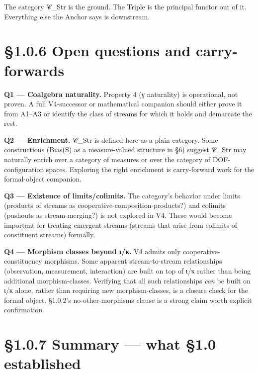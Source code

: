 \documentclass[11pt, openany]{book}
\newcommand{\sectionbreak}{\clearpage}
\begin{document}
The category 𝒞\_\allowbreak{}Str is the ground. The Triple is the principal functor out of it. Everything else the Anchor says is downstream.

\sectionbreak

\section{§1.0.6 Open questions and carry-forwards}

\textbf{Q1 --- Coalgebra naturality.} Property 4 (γ naturality) is operational, not proven. A full V4-successor or mathematical companion should either prove it from A1–A3 or identify the class of streams for which it holds and demarcate the rest.

\textbf{Q2 --- Enrichment.} 𝒞\_\allowbreak{}Str is defined here as a plain category. Some constructions (Bias(S) as a measure-valued structure in §6) suggest 𝒞\_\allowbreak{}Str may naturally enrich over a category of measures or over the category of DOF-configuration spaces. Exploring the right enrichment is carry-forward work for the formal-object companion.

\textbf{Q3 --- Existence of limits/colimits.} The category's behavior under limits (products of streams as cooperative-composition-products?) and colimits (pushouts as stream-merging?) is not explored in V4. These would become important for treating emergent streams (streams that arise from colimits of constituent streams) formally.

\textbf{Q4 --- Morphism classes beyond ι/κ.} V4 admits only cooperative-constituency morphisms. Some apparent stream-to-stream relationships (observation, measurement, interaction) are built on top of ι/κ rather than being additional morphism-classes. Verifying that all such relationships \textit{can} be built on ι/κ alone, rather than requiring new morphism-classes, is a closure check for the formal object. §1.0.2's no-other-morphisms clause is a strong claim worth explicit confirmation.

\sectionbreak

\section{§1.0.7 Summary --- what §1.0 established}
\end{document}
